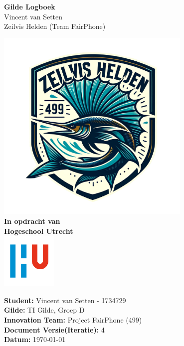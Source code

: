 \documentclass[a4paper]{report}
\newcommand{\latestVersion}{4}
\begin{document}
\begin{titlepage}
  \begin{center}
      \vspace*{.6cm}
      \Huge
      \textbf{ Gilde Logboek }\\
      \vspace{0.2cm}
      \small Vincent van Setten \\
      \small Zeilvis Helden (Team FairPhone)

      \normalsize


      \vspace{1cm}
      \includegraphics[width=0.7\textwidth]{Images/zeilvis_helden.png}
      \vspace{1cm}
      \Large\\
      \textbf{In opdracht van}\\
      \large
      \textbf{Hogeschool Utrecht} \\
      \includegraphics[width=0.2\textwidth]{Images/logouni.png}


      \vfill
    \end{center}
      \textbf{Student:} Vincent van Setten - 1734729 \\
      \textbf{Gilde:} TI Gilde, Groep D\\
      \textbf{Innovation Team:} Project FairPhone (499) \\
      \textbf{Document Versie(Iteratie):} \latestVersion \\
      \textbf{Datum:} \today \\
      \vspace{2cm}
\end{titlepage}
\end{document}
